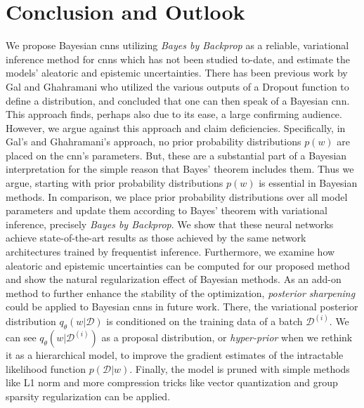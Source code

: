 \chapter{Conclusion and Outlook}

We propose Bayesian \acp{cnn} utilizing \textit{Bayes by Backprop} as a reliable, variational inference method for \acp{cnn} which has not been studied to-date, and estimate the models' aleatoric and epistemic uncertainties.
\newline There has been previous work by Gal and Ghahramani \cite{gal2015bayesian} who utilized the various outputs of a Dropout function to define a distribution, and concluded that one can then speak of a Bayesian \ac{cnn}. This approach finds, perhaps also due to its ease, a large confirming audience. However, we argue against this approach and claim deficiencies. Specifically, in Gal's and Ghahramani's \cite{gal2015bayesian} approach, no prior probability distributions $p(w)$ are placed on the \ac{cnn}'s parameters. But, these are a substantial part of a Bayesian interpretation for the simple reason that Bayes' theorem includes them. Thus we argue, starting with prior probability distributions $p(w)$ is essential in Bayesian methods. In comparison, we place prior probability distributions over all model parameters and update them according to Bayes' theorem with variational inference, precisely \textit{Bayes by Backprop}. We show that these neural networks achieve state-of-the-art results as those achieved by the same network architectures trained by frequentist inference. Furthermore, we examine how aleatoric and epistemic uncertainties can be computed for our proposed method and show the natural regularization effect of Bayesian methods.
\newline As an add-on method to further enhance the stability of the optimization, \textit{posterior sharpening} \cite{fortunato2017bayesian} could be applied to Bayesian \acp{cnn} in future work. There, the variational posterior distribution $q_{\theta}(w|\mathcal{D})$ is conditioned on the training data of a batch $\mathcal{D}^{(i)}$. We can see $q_{\theta}(w|\mathcal{D}^{(i)})$ as a proposal distribution, or \textit{hyper-prior} when we rethink it as a hierarchical model, to improve the gradient estimates of the intractable likelihood function $p(\mathcal{D}|w)$. Finally, the model is pruned with simple methods like L1 norm and more compression tricks like vector quantization \cite{DBLP:journals/corr/GongLYB14} and group sparsity regularization  \cite{DBLP:conf/nips/AlvarezS16} can be applied. 
%